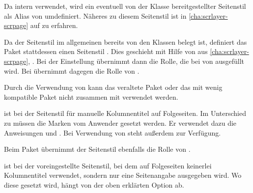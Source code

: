 \begin{description}
  Da  intern
  \hyperref[cha:scrlayer-scrpage]{} verwendet, wird
  ein eventuell von der Klasse bereitgestellter Seitenstil
   als Alias von
   umdefiniert. Näheres zu
  diesem Seitenstil ist in \autoref{cha:scrlayer-scrpage} auf
   zu erfahren.
\item[{\PageStyle{letter}}]
  Da der Seitenstil  im allgemeinen bereits von den
  Klassen belegt ist, definiert das Paket
   stattdessen einen Seitenstil
  . Dies geschieht mit Hilfe von
  \hyperref[cha:scrlayer-scrpage]{} aus
  \autoref{cha:scrlayer-scrpage}, . Bei der
  Einstellung %
   übernimmt  dann die Rolle, die bei
   von  ausgefüllt wird. Bei
   übernimmt  dagegen die Rolle von
  .
  
  Durch die Verwendung von
  \hyperref[cha:scrlayer-scrpage]{} kann das
  veraltete Paket 
  oder das mit \KOMAScript{} wenig kompatible Paket
   nicht zusammen mit
   verwendet werden.
\item[{\PageStyle{myheadings}}]
  ist bei  der Seitenstil für
  manuelle Kolumnentitel auf Folgeseiten. Im Unterschied zu 
  müssen die Marken vom Anwender gesetzt werden. Er verwendet dazu die
  Anweisungen  und
  . Bei Verwendung von
  \hyperref[cha:scrlayer-scrpage]{} steht außerdem
   zur Verfügung.

  Beim Paket  übernimmt der
  Seitenstil  ebenfalls die Rolle von
  .
\item[{\PageStyle{plain}}]
  ist bei 
  der voreingestellte Seitenstil, bei dem auf Folgeseiten keinerlei
  Kolumnentitel verwendet, sondern nur eine Seitenangabe ausgegeben wird. Wo
  diese gesetzt wird, hängt von der oben erklärten Option
   ab.


\end{description}
